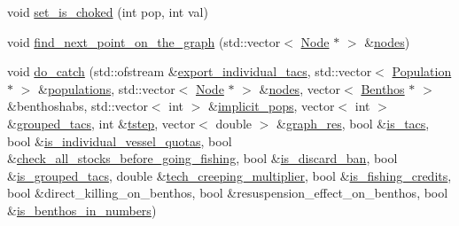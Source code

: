 \begin{DoxyCompactItemize}
void \mbox{\hyperlink{class_vessel_ad734b1b30a7306d192a0a2a5b1d474d7}{set\+\_\+is\+\_\+choked}} (int pop, int val)
\item 
void \mbox{\hyperlink{class_vessel_a9e268e15ce2dfd85b3566fc23da114f7}{find\+\_\+next\+\_\+point\+\_\+on\+\_\+the\+\_\+graph}} (std\+::vector$<$ \mbox{\hyperlink{class_node}{Node}} $\ast$ $>$ \&\mbox{\hyperlink{thread__vessels_8cpp_ace5675146c8515428d094fd142d8a2d2}{nodes}})
\item 
void \mbox{\hyperlink{class_vessel_a7134c14aa3c1d2fd09e4adca4b9b851b}{do\+\_\+catch}} (std\+::ofstream \&\mbox{\hyperlink{thread__vessels_8cpp_a0ce9054b3d0c5f983ad61d3ed27346f7}{export\+\_\+individual\+\_\+tacs}}, std\+::vector$<$ \mbox{\hyperlink{class_population}{Population}} $\ast$ $>$ \&\mbox{\hyperlink{thread__vessels_8cpp_a52b340841e812112c424c384bb9e7ebc}{populations}}, std\+::vector$<$ \mbox{\hyperlink{class_node}{Node}} $\ast$ $>$ \&\mbox{\hyperlink{thread__vessels_8cpp_ace5675146c8515428d094fd142d8a2d2}{nodes}}, vector$<$ \mbox{\hyperlink{class_benthos}{Benthos}} $\ast$ $>$ \&benthoshabs, std\+::vector$<$ int $>$ \&\mbox{\hyperlink{thread__vessels_8cpp_a249b6522d595e6a057580471ab5a4517}{implicit\+\_\+pops}}, vector$<$ int $>$ \&\mbox{\hyperlink{thread__vessels_8cpp_a97daf2d4365464f7857a6aaa9d7c30d6}{grouped\+\_\+tacs}}, int \&\mbox{\hyperlink{thread__vessels_8cpp_a84bc73d278de929ec9974e1a95d9b23a}{tstep}}, vector$<$ double $>$ \&\mbox{\hyperlink{thread__vessels_8cpp_a9675088ccad28b0b0b25632f3d07bef8}{graph\+\_\+res}}, bool \&\mbox{\hyperlink{thread__vessels_8cpp_a17091dbfd3e7ab134a48655f32fcce7f}{is\+\_\+tacs}}, bool \&\mbox{\hyperlink{thread__vessels_8cpp_ae2836a05a7b3b65a0cc12d46c45106cc}{is\+\_\+individual\+\_\+vessel\+\_\+quotas}}, bool \&\mbox{\hyperlink{thread__vessels_8cpp_a7cafd21963997900577877c8c45a9e46}{check\+\_\+all\+\_\+stocks\+\_\+before\+\_\+going\+\_\+fishing}}, bool \&\mbox{\hyperlink{thread__vessels_8cpp_a43d33e636da7abaf274535b7fb7bff02}{is\+\_\+discard\+\_\+ban}}, bool \&\mbox{\hyperlink{thread__vessels_8cpp_ae43c7f8149be4df710cc5b08a658b90f}{is\+\_\+grouped\+\_\+tacs}}, double \&\mbox{\hyperlink{thread__vessels_8cpp_acc56616fd5c18d056dd121677d7ae225}{tech\+\_\+creeping\+\_\+multiplier}}, bool \&\mbox{\hyperlink{thread__vessels_8cpp_a59693db331770b9d480a8866dba7b87a}{is\+\_\+fishing\+\_\+credits}}, bool \&direct\+\_\+killing\+\_\+on\+\_\+benthos, bool \&resuspension\+\_\+effect\+\_\+on\+\_\+benthos, bool \&\mbox{\hyperlink{thread__vessels_8cpp_a18eba4224a5ba1903a19868de715cf93}{is\+\_\+benthos\+\_\+in\+\_\+numbers}})
\item 

\end{DoxyCompactItemize}
